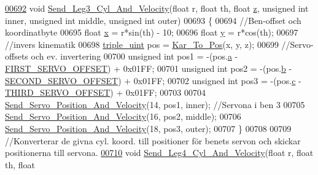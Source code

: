 \begin{DoxyCode}
\hypertarget{servo___u_a_r_t_8c_source.tex_l00692}{}\hyperlink{servo___u_a_r_t_8h_a3f98bedbfd8c6462fbc873fd56ad6094}{00692} \textcolor{keywordtype}{void} \hyperlink{servo___u_a_r_t_8c_a3f98bedbfd8c6462fbc873fd56ad6094}{Send\_Leg3\_Cyl\_And\_Velocity}(\textcolor{keywordtype}{float} r, \textcolor{keywordtype}{float} th, \textcolor{keywordtype}{float} 
      \hyperlink{over__hinder_8c_af73583b1e980b0aa03f9884812e9fd4d}{z}, \textcolor{keywordtype}{unsigned} \textcolor{keywordtype}{int} inner, \textcolor{keywordtype}{unsigned} \textcolor{keywordtype}{int} middle, \textcolor{keywordtype}{unsigned} \textcolor{keywordtype}{int} outer)
00693 \{
00694     \textcolor{comment}{//Ben-offset och koordinatbyte}
00695     \textcolor{keywordtype}{float} \hyperlink{sensor_8h_a6c4b361d72eb3767ba424ac9a6ecf52b}{x} = r*sin(th) - 10; 
00696     \textcolor{keywordtype}{float} \hyperlink{sensor_8h_a0ed6a908288e0cd87f79c1b5ab56d07c}{y} = r*cos(th);
00697     \textcolor{comment}{//invers kinematik }
00698     \hyperlink{structtriple__uint}{triple\_uint} pos = \hyperlink{invers__kinematik_8c_a68f82386196ad991ed54fb9796d90f7c}{Kar\_To\_Pos}(x, y, z);
00699     \textcolor{comment}{//Servo-offsets och ev. invertering }
00700     \textcolor{keywordtype}{unsigned} \textcolor{keywordtype}{int} pos1 = -(pos.\hyperlink{structtriple__uint_a0ea8a85723620c90be9fd2a693f12a59}{a} - \hyperlink{servo___u_a_r_t_8c_a4c437d01d2f060ec86c16ed5e76efe45}{FIRST\_SERVO\_OFFSET}) + 0x01FF;
00701     \textcolor{keywordtype}{unsigned} \textcolor{keywordtype}{int} pos2 = -(pos.\hyperlink{structtriple__uint_a790d5baa17ec7aaf7bb49750a16e9c29}{b} - \hyperlink{servo___u_a_r_t_8c_acb02dedbe5ff19694bdb5b2ddf61664a}{SECOND\_SERVO\_OFFSET}) + 0x01FF;
00702     \textcolor{keywordtype}{unsigned} \textcolor{keywordtype}{int} pos3 = -(pos.\hyperlink{structtriple__uint_a6ce17b018c47d0f1d0e53a458f741ad3}{c} - \hyperlink{servo___u_a_r_t_8c_ac2f065c44b617c91ea7f4237e8ead729}{THIRD\_SERVO\_OFFSET}) + 0x01FF; 
00703 
00704     \hyperlink{servo___u_a_r_t_8c_aef28545296037ecc0350638a407a680f}{Send\_Servo\_Position\_And\_Velocity}(14, pos1, inner); \textcolor{comment}{//Servona i ben 3}
00705     \hyperlink{servo___u_a_r_t_8c_aef28545296037ecc0350638a407a680f}{Send\_Servo\_Position\_And\_Velocity}(16, pos2, middle);
00706     \hyperlink{servo___u_a_r_t_8c_aef28545296037ecc0350638a407a680f}{Send\_Servo\_Position\_And\_Velocity}(18, pos3, outer);
00707 \}
00708 
00709 \textcolor{comment}{//Konverterar de givna cyl. koord. till positioner för benets servon och skickar positionerna till servona.}
\hypertarget{servo___u_a_r_t_8c_source.tex_l00710}{}\hyperlink{servo___u_a_r_t_8h_a6cddf44c6a11c7907911d03af1e3f127}{00710} \textcolor{keywordtype}{void} \hyperlink{servo___u_a_r_t_8c_a6cddf44c6a11c7907911d03af1e3f127}{Send\_Leg4\_Cyl\_And\_Velocity}(\textcolor{keywordtype}{float} r, \textcolor{keywordtype}{float} th, \textcolor{keywordtype}{float} 

\end{DoxyCode}
